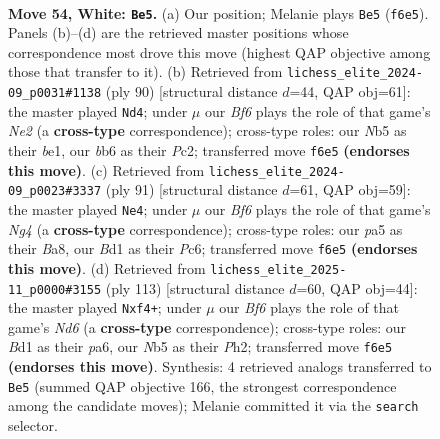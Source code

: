 \documentclass[11pt]{article}
\begin{document}
\clearpage

\begin{figure}[p]\centering
\begin{subfigure}{0.46\textwidth}\centering
\resizebox{\linewidth}{!}{%
\newchessgame
\chessboard[
  setfen={nn6/1p5k/1b3B2/pN1p4/6bp/PP2P3/4P1K1/3B4 w - - 4 54},
  showmover=false,
  pgfstyle=straightmove, color=movearrow, markmove={f6-e5}
]}
\caption{}
\end{subfigure}\hfill
\begin{subfigure}{0.46\textwidth}\centering
\resizebox{\linewidth}{!}{%
\newchessgame
\chessboard[
  setfen={8/4k3/7p/5p1b/5P1p/1BpP1P2/2P1N1K1/4b3 w - - 0 46},
  showmover=false,
  pgfstyle=straightmove, color=movearrow, markmove={e2-d4}
]}
\caption{}
\end{subfigure}
\\[4pt]
\begin{subfigure}{0.46\textwidth}\centering
\resizebox{\linewidth}{!}{%
\newchessgame
\chessboard[
  setfen={b7/P4k2/2p5/3p2n1/1B5p/1B5P/1P4P1/6K1 b - - 0 46},
  showmover=false,
  pgfstyle=straightmove, color=movearrow, markmove={g5-e4}
]}
\caption{}
\end{subfigure}\hfill
\begin{subfigure}{0.46\textwidth}\centering
\resizebox{\linewidth}{!}{%
\newchessgame
\chessboard[
  setfen={8/k7/P2bp3/2p2p2/2P2P2/3nB3/6Kp/7N b - - 0 57},
  showmover=false,
  pgfstyle=straightmove, color=movearrow, markmove={d3-f4}
]}
\caption{}
\end{subfigure}
\caption{\textbf{Move 54, White: \texttt{Be5}.} (a) Our position; Melanie plays \texttt{Be5} (\texttt{f6e5}). Panels (b)--(d) are the retrieved master positions whose correspondence most drove this move (highest QAP objective among those that transfer to it). (b) Retrieved from \texttt{lichess\_elite\_2024-09\_p0031\#1138} (ply 90) [structural distance $d$=44, QAP obj=61]: the master played \texttt{Nd4}; under $\mu$ our \emph{Bf6} plays the role of that game's \emph{Ne2} (a \textbf{cross-type} correspondence); cross-type roles: our \emph{N}b5 as their \emph{b}e1, our \emph{b}b6 as their \emph{P}c2; transferred move \texttt{f6e5} \textbf{(endorses this move)}. (c) Retrieved from \texttt{lichess\_elite\_2024-09\_p0023\#3337} (ply 91) [structural distance $d$=61, QAP obj=59]: the master played \texttt{Ne4}; under $\mu$ our \emph{Bf6} plays the role of that game's \emph{Ng4} (a \textbf{cross-type} correspondence); cross-type roles: our \emph{p}a5 as their \emph{B}a8, our \emph{B}d1 as their \emph{P}c6; transferred move \texttt{f6e5} \textbf{(endorses this move)}. (d) Retrieved from \texttt{lichess\_elite\_2025-11\_p0000\#3155} (ply 113) [structural distance $d$=60, QAP obj=44]: the master played \texttt{Nxf4+}; under $\mu$ our \emph{Bf6} plays the role of that game's \emph{Nd6} (a \textbf{cross-type} correspondence); cross-type roles: our \emph{B}d1 as their \emph{p}a6, our \emph{N}b5 as their \emph{P}h2; transferred move \texttt{f6e5} \textbf{(endorses this move)}. Synthesis: 4 retrieved analogs transferred to \texttt{Be5} (summed QAP objective 166, the strongest correspondence among the candidate moves); Melanie committed it via the \texttt{search} selector.}
\label{fig:thought-m106}
\end{figure}
\end{document}
